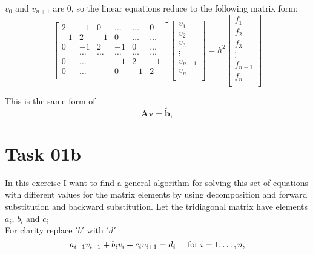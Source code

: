 $v_0$ and $v_{n+1}$ are 0, so the linear equations reduce to the following matrix form:
\[
\begin{bmatrix}
       2& -1& 0 &\dots   & \dots &0 \\
       -1 & 2 & -1 &0 &\dots &\dots \\
       0&-1 &2 & -1 & 0 & \dots \\
       & \dots   & \dots &\dots   &\dots & \dots \\
       0&\dots   &  &-1 &2& -1 \\
       0&\dots    &  & 0  &-1 & 2 \\
\end{bmatrix}
\begin{bmatrix}
	v_1 \\
	v_2 \\
	v_3 \\
	\vdots \\
	v_{n-1} \\
	v_n \\                      
\end{bmatrix} = 
h^2
\begin{bmatrix}
	f_1 \\
	f_2 \\
	f_3 \\
	\vdots \\
	f_{n-1} \\
	f_n \\                      
\end{bmatrix}
\]

This is the same form of 
\begin{equation*}
   \mathbf{A}\mathbf{v} = \tilde{\mathbf{b}},
\end{equation*}

\section{Task 01b}
In this exercise I want to find a general algorithm for solving this set of equations with different values for the matrix elements by using decomposition and forward substitution and backward substitution. Let the tridiagonal matrix have elements $a_i$, $b_i$ and $c_i$\\

For clarity replace $'\tilde{b}'$ with $'d'$
\begin{equation*}
   a_{i-1} v_{i-1} + b_i v_i + c_i v_{i+1} = d_i  \hspace{0.5cm} \mathrm{for} \hspace{0.1cm} i=1,\dots, n,
\end{equation*}

